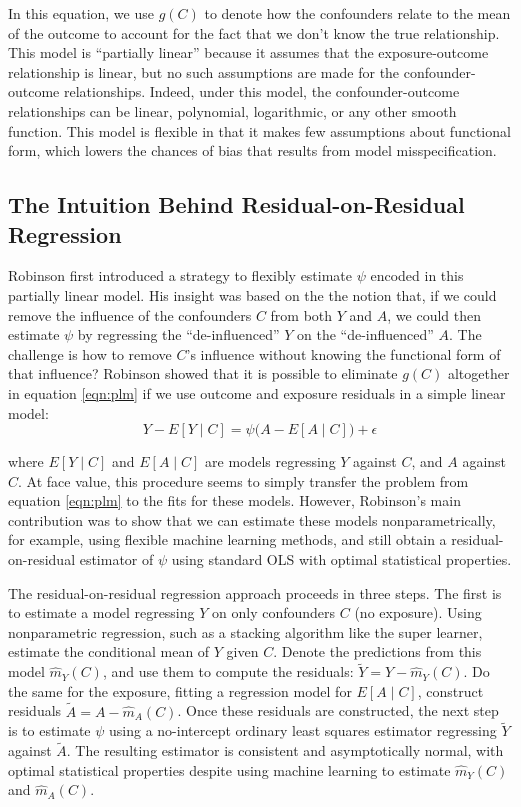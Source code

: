 \documentclass[12pt]{article}
\begin{document}
In this equation, we use $g(C)$ to denote how the confounders relate to the mean of the outcome to account for the fact that we don't know the true relationship. This model is ``partially linear'' because it assumes that the exposure-outcome relationship is linear, but no such assumptions are made for the confounder-outcome relationships. Indeed, under this model, the confounder-outcome relationships can be linear, polynomial, logarithmic, or any other smooth function. This model is flexible in that it makes few assumptions about functional form, which lowers the chances of bias that results from model misspecification.

\subsection{The Intuition Behind Residual-on-Residual Regression}

Robinson first introduced a strategy to flexibly estimate $\psi$ encoded in this partially linear model.\cite{Robinson1988} His insight was based on the the notion that, if we could remove the influence of the confounders $C$ from both $Y$ and $A$, we could then estimate $\psi$ by regressing the ``de-influenced'' $Y$ on the ``de-influenced'' $A$. The challenge is how to remove $C$'s influence without knowing the functional form of that influence? Robinson showed that it is possible to eliminate $g(C)$ altogether in equation \ref{eqn:plm} if we use outcome and exposure residuals in a simple linear model:
\begin{equation}
Y - E[Y \mid C] = \psi \big( A - E[A \mid C] \big) + \epsilon \label{eqn:ronr}
\end{equation}

\noindent where $E[Y \mid C]$ and $E[A \mid C]$ are models regressing $Y$ against $C$, and $A$ against $C$. At face value, this procedure seems to simply transfer the problem from equation \ref{eqn:plm} to the fits for these models. However, Robinson's main contribution was to show that we can estimate these models nonparametrically, for example, using flexible machine learning methods, and still obtain a residual-on-residual estimator of $\psi$ using standard OLS with optimal statistical properties.

The residual-on-residual regression approach proceeds in three steps. The first is to estimate a model regressing $Y$ on only confounders $C$ (no exposure). Using nonparametric regression, such as a stacking algorithm like the super learner, estimate the conditional mean of $Y$ given $C$. Denote the predictions from this model $\hat{m}_Y(C)$, and use them to compute the residuals: $\tilde{Y} = Y - \hat{m}_Y(C)$. Do the same for the exposure, fitting a regression model for $E[A \mid C]$, construct residuals $\tilde{A} = A - \hat{m}_A(C)$. Once these residuals are constructed, the next step is to estimate $\psi$ using a no-intercept ordinary least squares estimator regressing $\tilde{Y}$ against $\tilde{A}$. The resulting estimator is consistent and asymptotically normal, with optimal statistical properties despite using machine learning to estimate $\hat{m}_Y(C)$ and $\hat{m}_A(C)$.
\end{document}
